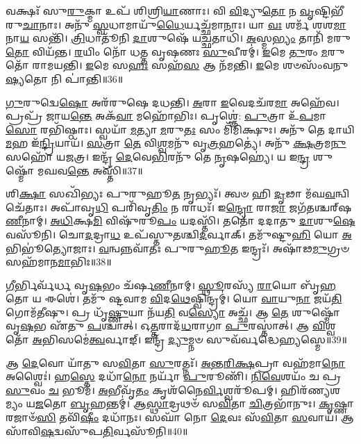 𑌵𑌕𑍍𑌷𑌃᳴ 𑌸𑍁\-\ul{𑌰𑍁}\-𑌕𑍍𑌮𑌾 𑌉𑌪᳴ 𑌶𑌿𑌶𑍍𑌰𑌿\-\ul{𑌯𑌾}\-𑌣𑌾𑌃।
𑌵𑌿 \ul{𑌵𑌿}\-𑌦𑍍𑌯𑍁\-\ul{𑌤𑍋} 𑌨 \ul{𑌵𑍃}\-𑌷𑍍𑌟𑌿𑌭𑍀᳴ 𑌰𑍁\-\ul{𑌚𑌾}\-𑌨𑌾𑌃।
𑌅𑌨𑍁᳴ \ul{𑌸𑍍𑌵}\-𑌧𑌾𑌮𑌾𑌯𑍁᳴\-\ul{𑌧𑍈}\-𑌰𑍍𑌯𑌚𑍍𑌛᳴𑌮𑌾𑌨𑌾𑌃।
𑌯𑌾 \ul{𑌵𑌃} 𑌶𑌰𑍍𑌮᳴ 𑌶𑌶\-\ul{𑌮𑌾}\-𑌨𑌾\-\ul{𑌯} 𑌸𑌨𑍍𑌤𑌿᳴।
\-\ul{𑌤𑍍𑌰𑌿}\-𑌧𑌾𑌤𑍂᳴𑌨𑌿 \ul{𑌦𑌾}\-𑌶𑍁𑌷𑍇᳴ 𑌯\-\ul{𑌚𑍍𑌛}\-𑌤𑌾𑌧𑌿᳴।
\-\ul{𑌅}\-𑌸𑍍𑌮\-\ul{𑌭𑍍𑌯𑌂} 𑌤𑌾𑌨𑌿᳴ 𑌮𑌰𑍁\-\ul{𑌤𑍋} 𑌵𑌿𑌯᳴𑌨𑍍𑌤।
\-\ul{𑌰}\-𑌯𑌿𑌂 𑌨𑍋᳴ 𑌧𑌤𑍍𑌤 𑌵𑍃𑌷𑌣𑌃 \ul{𑌸𑍁}\-𑌵𑍀𑌰𑌮𑍍॑।
\-\ul{𑌇}\-𑌮𑍇 \ul{𑌤𑍁}\-𑌰𑌂 \ul{𑌮}\-𑌰𑍁𑌤𑍋᳴ 𑌰𑌾𑌮𑌯𑌨𑍍𑌤𑌿।
\-\ul{𑌇}\-𑌮𑍇 𑌸\-\ul{𑌹𑌃} 𑌸𑌹᳴\-\ul{𑌸} 𑌆 𑌨᳴𑌮𑌨𑍍𑌤𑌿।
\-\ul{𑌇}\-𑌮𑍇 𑌶𑍞𑌸𑌂᳴𑌵𑌨𑍁\-\ul{𑌷𑍍𑌯}\-𑌤𑍋 𑌨𑌿 𑌪𑌾॑𑌨𑍍𑌤𑌿॥36॥

\-\ul{𑌗𑍁}\-𑌰𑍁𑌦𑍍𑌵𑍇\-\ul{𑌷𑍋} 𑌅𑌰᳴𑌰𑍁𑌷𑍇 𑌦𑌧𑌨𑍍𑌤𑌿।
\-\ul{𑌅}\-𑌰𑌾 \ul{𑌇}\-𑌵𑍇𑌦𑌚᳴𑌰\-\ul{𑌮𑌾} 𑌅𑌹𑍇᳴𑌵।
𑌪𑍍𑌰𑌪𑍍𑌰᳴ 𑌜𑌾𑌯\-\ul{𑌨𑍍𑌤𑍇} 𑌅𑌕᳴\-\ul{𑌵𑌾} 𑌮𑌹𑍋᳴𑌭𑌿𑌃।
𑌪𑍃𑌶𑍍𑌞𑍇॑: \ul{𑌪𑍁}\-𑌤𑍍𑌰𑌾 𑌉᳴\-\ul{𑌪}\-𑌮𑌾\-\ul{𑌸𑍋} 𑌰𑌭𑌿᳴𑌷𑍍𑌠𑌾𑌃।
𑌸𑍍𑌵𑌯𑌾᳴ \ul{𑌮}\-𑌤𑍍𑌯𑌾 \ul{𑌮}\-𑌰𑍁\-\ul{𑌤𑌃} 𑌸𑌂 𑌮𑌿᳴𑌮𑌿𑌕𑍍𑌷𑍁𑌃।
𑌅𑌨𑍁᳴ 𑌤𑍇 𑌦𑌾𑌯𑌿 \ul{𑌮}\-𑌹 𑌇᳴\-\ul{𑌨𑍍𑌦𑍍𑌰𑌿}\-𑌯𑌾𑌯᳴।
\-\ul{𑌸}\-𑌤𑍍𑌰𑌾 \ul{𑌤𑍇} 𑌵𑌿\-\ul{𑌶𑍍𑌵}\-𑌮𑌨𑍁᳴ 𑌵𑍃\-\ul{𑌤𑍍𑌰}\-𑌹𑌤𑍍𑌯𑍇॑।
𑌅𑌨𑍁᳴ \ul{𑌕𑍍𑌷}\-𑌤𑍍𑌰𑌮\-\ul{𑌨𑍁} 𑌸𑌹𑍋᳴ 𑌯𑌜𑌤𑍍𑌰।
𑌇𑌨𑍍𑌦𑍍𑌰᳴ \ul{𑌦𑍇}\-𑌵𑍇\-\ul{𑌭𑌿}\-𑌰𑌨𑍁᳴ 𑌤𑍇 \ul{𑌨𑍃}\-𑌷𑌹𑍍𑌯𑍇॑।
𑌯 𑌇\-\ul{𑌨𑍍𑌦𑍍𑌰} 𑌶𑍁𑌷𑍍𑌮𑍋᳴ 𑌮𑌘𑌵\-\ul{𑌨𑍍𑌤𑍇} 𑌅𑌸𑍍𑌤𑌿᳴॥37॥

𑌶𑌿\-\ul{𑌕𑍍𑌷𑌾} 𑌸𑌖𑌿᳴𑌭𑍍𑌯𑌃 𑌪𑍁𑌰𑍁𑌹𑍂\-\ul{𑌤} 𑌨𑍃𑌭𑍍𑌯𑌃᳴।
𑌤𑍍𑌵𑍞 𑌹𑌿 \ul{𑌦𑍃}\-𑌢𑌾 𑌮᳴𑌘\-\ul{𑌵}\-𑌨𑍍𑌵𑌿𑌚𑍇᳴𑌤𑌾𑌃।
𑌅𑌪𑌾᳴𑌵𑍃\-\ul{𑌧𑌿} 𑌪𑌰𑌿᳴𑌵𑍃\-\ul{𑌤𑌿𑌂} 𑌨 𑌰𑌾𑌧𑌃᳴।
𑌇\-\ul{𑌨𑍍𑌦𑍍𑌰𑍋} 𑌰𑌾\-\ul{𑌜𑌾} 𑌜𑌗᳴𑌤𑌶𑍍𑌚𑌰𑍍‌\mbox{}𑌷\-\ul{𑌣𑍀}\-𑌨𑌾𑌮𑍍।
\-\ul{𑌅}\-\-\ul{𑌧𑌿}\-𑌕𑍍𑌷\-\ul{𑌮𑌿} 𑌵𑌿𑌷𑍁᳴𑌰𑍂\-\ul{𑌪𑌂} 𑌯𑌦𑌸𑍍𑌤𑌿᳴।
𑌤𑌤𑍋᳴ 𑌦𑌦𑌾𑌤𑍁 \ul{𑌦𑌾}\-𑌶𑍁\-\ul{𑌷𑍇} 𑌵𑌸𑍂᳴𑌨𑌿।
𑌚𑍋\-\ul{𑌦}\-𑌦𑍍𑌰𑌾\-\ul{𑌧} 𑌉𑌪᳴𑌸𑍍𑌤𑍁𑌤𑌶𑍍𑌚𑌿\-\ul{𑌦}\-𑌰𑍍𑌵𑌾𑌕𑍍।
𑌤𑌮𑍁᳴𑌷𑍍𑌟𑍁\-\ul{𑌹𑌿} 𑌯𑍋 \ul{𑌅}\-𑌭𑌿𑌭𑍂॑𑌤𑍍𑌯𑍋𑌜𑌾𑌃।
\-\ul{𑌵}\-𑌨𑍍𑌵𑌨𑍍𑌨𑌵𑌾᳴𑌤𑌃 𑌪𑍁𑌰𑍁\-\ul{𑌹𑍂}\-𑌤 𑌇𑌨𑍍𑌦𑍍𑌰𑌃᳴।
𑌅𑌷𑌾᳴𑌢\-\ul{𑌮𑍁}\-𑌗𑍍𑌰𑍞 𑌸𑌹᳴𑌮𑌾𑌨\-\ul{𑌮𑌾}\-𑌭𑌿𑌃॥38॥

\-\ul{𑌗𑍀}\-𑌰𑍍𑌭𑌿𑌰𑍍𑌵᳴𑌰𑍍𑌧 𑌵𑍃\-\ul{𑌷}\-𑌭𑌂 𑌚᳴𑌰𑍍\mbox{}𑌷\-\ul{𑌣𑍀}\-𑌨𑌾𑌮𑍍।
\-\ul{𑌸𑍍𑌥𑍂}\-𑌰𑌸𑍍𑌯᳴ \ul{𑌰𑌾}\-𑌯𑍋 𑌬𑍃᳴\-\ul{𑌹}\-𑌤𑍋 𑌯 𑌈𑌶𑍇॑।
𑌤𑌮𑍁᳴ 𑌷𑍍𑌟𑌵𑌾𑌮 \ul{𑌵𑌿}\-𑌦\-\ul{𑌥𑍇}\-𑌷𑍍𑌵𑌿𑌨𑍍𑌦𑍍𑌰𑌮𑍍॑।
𑌯𑍋 \ul{𑌵𑌾}\-𑌯𑍁\-\ul{𑌨𑌾} 𑌜𑌯᳴\-\ul{𑌤𑌿} 𑌗𑍋𑌮᳴𑌤𑍀𑌷𑍁।
𑌪𑍍𑌰 𑌧𑍃᳴\-\ul{𑌷𑍍𑌣𑍁}\-𑌯𑌾 𑌨᳴𑌯\-\ul{𑌤𑌿} 𑌵\-\ul{𑌸𑍍𑌯𑍋} 𑌅𑌚𑍍𑌛᳴।
𑌆 \ul{𑌤𑍇} 𑌶𑍁𑌷𑍍𑌮𑍋᳴ 𑌵𑍃\-\ul{𑌷}\-𑌭 𑌏᳴𑌤𑍁 \ul{𑌪}\-𑌶𑍍𑌚𑌾𑌤𑍍।
𑌓\-\ul{𑌤𑍍𑌤}\-𑌰𑌾𑌦᳴\-\ul{𑌧}\-𑌰𑌾𑌗𑌾 \ul{𑌪𑍁}\-𑌰𑌸𑍍𑌤𑌾॑𑌤𑍍।
𑌆 \ul{𑌵𑌿}\-𑌶𑍍𑌵𑌤𑍋᳴ \ul{𑌅}\-𑌭𑌿𑌸𑌮𑍇॑\-\ul{𑌤𑍍𑌵}\-𑌰𑍍𑌵𑌾𑌙𑍍।
𑌇𑌨𑍍𑌦𑍍𑌰᳴ \ul{𑌦𑍍𑌯𑍁}\-𑌮𑍍𑌨𑍞 𑌸𑍁𑌵᳴𑌰𑍍𑌵𑌦𑍍𑌧𑍇\-\ul{𑌹𑍍𑌯}\-𑌸𑍍𑌮𑍇॥39॥\anuvakamend[\-\ul{𑌵}\-𑌰𑌾𑌹𑍈॑\-\ul{𑌰𑍍𑌵𑌿}\-𑌶𑍍𑌵𑌹𑌾᳴\-𑌽𑌜𑌨𑌿𑌷𑍍𑌟 \ul{𑌪𑍂}\-𑌷𑍋𑌦𑍍𑌵𑌰𑍀᳴𑌵𑍃𑌜\-\ul{𑌤𑍍𑌖𑌾}\-𑌦𑌯𑍋᳴ 𑌵𑌃 \ul{𑌪𑌾}\-𑌨𑍍𑌤𑍍𑌯\-\ul{𑌸𑍍𑌤𑍍𑌯𑌾}\-𑌭𑌿𑌰𑍍𑌨𑌵᳴ 𑌚]

𑌆 \ul{𑌦𑍇}\-𑌵𑍋 𑌯𑌾᳴𑌤𑍁 𑌸\-\ul{𑌵𑌿}\-𑌤𑌾 \ul{𑌸𑍁}\-𑌰𑌤𑍍𑌨𑌃᳴।
\-\ul{𑌅}\-\-\ul{𑌨𑍍𑌤}\-\-\ul{𑌰𑌿}\-\-\ul{𑌕𑍍𑌷}\-𑌪𑍍𑌰𑌾 𑌵𑌹᳴𑌮𑌾\-\ul{𑌨𑍋} 𑌅𑌶𑍍𑌵𑍈𑌃॑।
𑌹\-\ul{𑌸𑍍𑌤𑍇} 𑌦𑌧𑌾᳴\-\ul{𑌨𑍋} 𑌨𑌰𑍍𑌯𑌾᳴ \ul{𑌪𑍁}\-𑌰𑍂𑌣𑌿᳴।
\-\ul{𑌨𑌿}\-\-\ul{𑌵𑍇}\-𑌶𑌯𑌂᳴ 𑌚 𑌪𑍍𑌰\-\ul{𑌸𑍁}\-𑌵𑌂 \ul{𑌚} 𑌭𑍂𑌮᳴।
\-\ul{𑌅}\-𑌭𑍀𑌵𑍃᳴\-\ul{𑌤𑌂} 𑌕𑍃𑌶᳴𑌨𑍈\-\ul{𑌰𑍍𑌵𑌿}\-𑌶𑍍𑌵𑌰𑍂᳴𑌪𑌮𑍍।
𑌹𑌿𑌰᳴𑌣𑍍𑌯𑌶𑌮𑍍𑌯𑌂 𑌯\-\ul{𑌜}\-𑌤𑍋 \ul{𑌬𑍃}\-𑌹𑌨𑍍𑌤𑌮𑍍॑।
𑌆\-\ul{𑌸𑍍𑌥𑌾}\-𑌦𑍍𑌰𑌥𑍞᳴ 𑌸\-\ul{𑌵𑌿}\-𑌤𑌾 \ul{𑌚𑌿}\-𑌤𑍍𑌰𑌭𑌾᳴𑌨𑍁𑌃।
\-\ul{𑌕𑍃}\-𑌷𑍍𑌣𑌾 𑌰𑌜𑌾𑍞᳴\-\ul{𑌸𑌿} 𑌤𑌵𑌿᳴\-\ul{𑌷𑍀𑌂} 𑌦𑌧𑌾᳴𑌨𑌃।
𑌸𑌘𑌾᳴ 𑌨𑍋 \ul{𑌦𑍇}\-𑌵𑌃 𑌸᳴\-\ul{𑌵𑌿}\-𑌤𑌾 \ul{𑌸}\-𑌵𑌾𑌯᳴।
𑌆 𑌸𑌾᳴𑌵𑌿\-\ul{𑌷}\-𑌦𑍍𑌵𑌸𑍁᳴𑌪\-\ul{𑌤𑌿}\-𑌰𑍍𑌵𑌸𑍂᳴𑌨𑌿॥40॥

